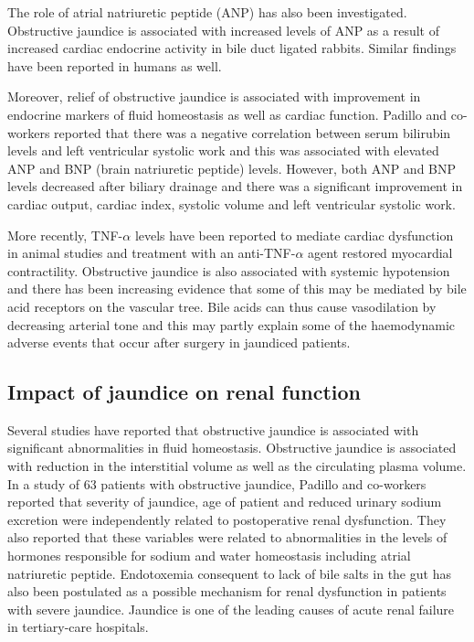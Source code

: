 The role of atrial natriuretic peptide (ANP) has also been investigated. Obstructive jaundice is associated with increased levels of ANP as a result of increased cardiac endocrine activity in bile duct ligated rabbits.\parencite{pereira_increased_1994} Similar findings have been reported in humans as well. \parencite{gallardo_increased_1998, martinez-rodenas_circulating_1998}

Moreover, relief of obstructive jaundice is associated with improvement in endocrine markers of fluid homeostasis as well as cardiac function. \parencite{padillo_improved_2001, gallardo_increased_1998} Padillo and co-workers reported that there was a negative correlation between serum bilirubin levels and left ventricular systolic work and this was associated with elevated ANP and BNP (brain natriuretic peptide) levels. However, both ANP and BNP levels decreased after biliary drainage and there was a significant improvement in cardiac output, cardiac index, systolic volume and left ventricular systolic work.\parencite{padillo_improved_2001}
	
More recently, TNF-$\alpha$ levels have been reported to mediate cardiac dysfunction in animal studies and treatment with an anti-TNF-$\alpha$ agent restored myocardial contractility.\parencite{yang_mechanisms_2010} Obstructive jaundice is also associated with systemic hypotension and there has been increasing evidence that some of this may be mediated by bile acid receptors on the vascular tree.\parencite{green_systemic_1995, lefebvre_role_2009} Bile acids can thus cause vasodilation by decreasing arterial tone and this may partly explain some of the haemodynamic adverse events that occur after surgery in jaundiced patients.

\subsection{Impact of jaundice on renal function}

Several studies have reported that obstructive jaundice is associated with significant abnormalities in fluid homeostasis. Obstructive jaundice is associated with reduction in the interstitial volume as well as the circulating plasma volume.\parencite{sitges-serra_body_1992, padillo_preoperative_1999} In a study of 63 patients with obstructive jaundice, Padillo and co-workers reported that severity of jaundice, age of patient and reduced urinary sodium excretion were independently related to postoperative renal dysfunction. They also reported that these variables were related to abnormalities in the levels of hormones responsible for sodium and water homeostasis including atrial natriuretic peptide.\parencite{padillo_multivariate_2005} Endotoxemia consequent to lack of bile salts in the gut has also been postulated as a possible mechanism for renal dysfunction in patients with severe jaundice.\parencite{bailey_endotoxin_1976} Jaundice is one of the leading causes of acute renal failure in tertiary-care hospitals.\parencite{liano_epidemiology_1996}

